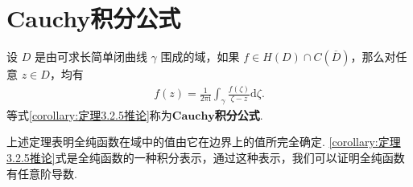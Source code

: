 \documentclass[../../main.tex]{subfiles}
\begin{document}
\section{Cauchy积分公式}

\begin{theorem}\label{theorem:定理3.4.1}
设 \( D \) 是由可求长简单闭曲线 \( \gamma \) 围成的域，如果 \( f \in H(D) \cap C(\overline{D}) \)，那么对任意 \( z \in D \)，均有
\begin{align}\label{equation:Cauchy积分公式1}
f(z) = \frac{1}{2\pi \mathrm{i}} \int_{\gamma} \frac{f(\zeta)}{\zeta - z} \mathrm{d}\zeta.
\end{align}
等式\eqref{corollary:定理3.2.5推论}称为$\mathbf{Cauchy}$\textbf{积分公式}.
\end{theorem}
\begin{note}
上述定理表明全纯函数在域中的值由它在边界上的值所完全确定. \eqref{corollary:定理3.2.5推论}式是全纯函数的一种积分表示，通过这种表示，我们可以证明全纯函数有任意阶导数.
\end{note}
\end{document}
